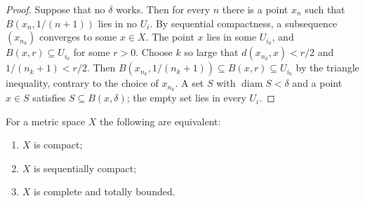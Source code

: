 \begin{proof}
Suppose that no $\delta$ works. Then for every $n$ there is a point $x_n$ such that $B(x_n,1/(n+1))$ lies in no $U_i$. By sequential compactness, a subsequence $(x_{n_k})$ converges to some $x\in X$. The point $x$ lies in some $U_{i_0}$, and $B(x,r)\subseteq U_{i_0}$ for some $r>0$. Choose $k$ so large that $d(x_{n_k},x)<r/2$ and $1/(n_k+1)<r/2$. Then $B(x_{n_k},1/(n_k+1))\subseteq B(x,r)\subseteq U_{i_0}$ by the triangle inequality, contrary to the choice of $x_{n_k}$. A set $S$ with $\operatorname{diam}S<\delta$ and a point $x\in S$ satisfies $S\subseteq B(x,\delta)$; the empty set lies in every $U_i$.
\end{proof}

\begin{theorem}
\label{thm:compact-equivalences}
For a metric space $X$ the following are equivalent:
\begin{enumerate}
\item $X$ is compact;
\item $X$ is sequentially compact;
\item $X$ is complete and totally bounded.
\end{enumerate}
\end{theorem}

